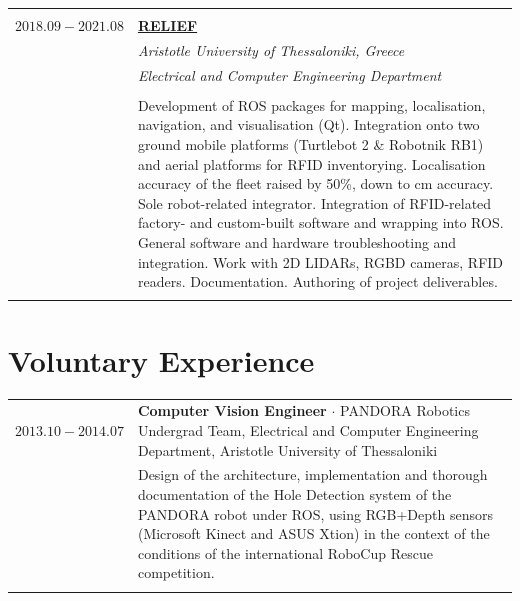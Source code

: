 \documentclass[a4paper,10pt,twoside]{article}
\begin{document}
\begin{tabular}{rp{11cm}}
&\\
$2018.09 - 2021.08$ & \href{https://relief.web.auth.gr/}{\textbf{RELIEF}} \\
                    & \textit{Aristotle University of Thessaloniki, Greece}\\
                    & \textit{Electrical and Computer Engineering Department} \\
\\
                    & Development of ROS packages for mapping, localisation, navigation, and visualisation (Qt). Integration onto two ground mobile platforms (Turtlebot 2 \& Robotnik RB1) and aerial platforms for RFID inventorying. Localisation accuracy of the fleet raised by 50\%, down to cm accuracy. Sole robot-related integrator. Integration of RFID-related factory- and custom-built software and wrapping into ROS. General software and hardware troubleshooting and integration. Work with 2D LIDARs, RGBD cameras, RFID readers. Documentation. Authoring of project deliverables.\\
&\\
\end{tabular}


\section{Voluntary Experience}

\begin{tabular}{rp{11cm}}
  $2013.10 -2014.07$ & \textbf{Computer Vision Engineer} $\cdot$ PANDORA Robotics Undergrad Team,
Electrical and Computer Engineering Department, Aristotle University of Thessaloniki\\
& \small{Design of the architecture, implementation and thorough documentation of
the Hole Detection system of the PANDORA robot under ROS, using RGB+Depth sensors
(Microsoft Kinect and ASUS Xtion) in the context of the conditions of the international
RoboCup Rescue competition.}\\
\multicolumn{2}{c}{} \\
\end{tabular}

\end{document}
